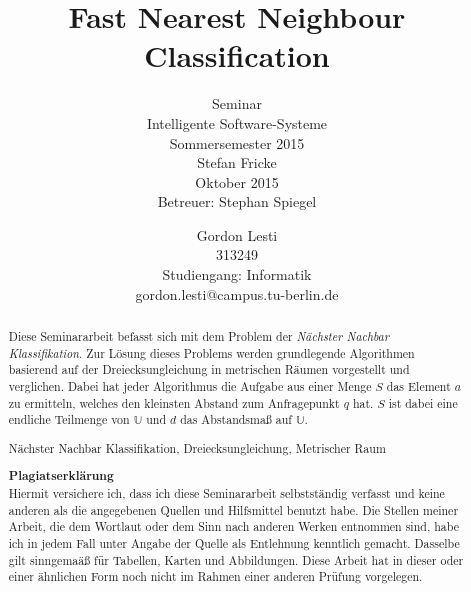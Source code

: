 \documentclass[deutsch,runningheads,a4paper]{llncs}
\newcommand{\keywords}[1]{\par\addvspace\baselineskip
\noindent\keywordname\enspace\ignorespaces#1}
\begin{document}
  \setcounter{tocdepth}{2}
  \makeatletter
  \renewcommand*\l@author[2]{}
  \renewcommand*\l@title[2]{}
  \makeatletter
  \title{Fast Nearest Neighbour Classification}
  \subtitle{\textnormal{\small{Seminar\\Intelligente Software-Systeme\\Sommersemester 2015}\\\vspace{1\baselineskip} Stefan Fricke\\\vspace{15\baselineskip} Oktober 2015\\Betreuer: Stephan Spiegel\\\vspace{2\baselineskip}}}
  
  \author{Gordon Lesti\\313249\\Studiengang: Informatik\\gordon.lesti@campus.tu-berlin.de}
  
  
  \maketitle
  \newpage
  
  \begin{abstract}
    Diese Seminararbeit befasst sich mit dem Problem der \textit{Nächster Nachbar Klassifikation}. Zur Lösung dieses
    Problems werden grundlegende Algorithmen basierend auf der Dreiecksungleichung in metrischen Räumen vorgestellt und
    verglichen. Dabei hat jeder Algorithmus die Aufgabe aus einer Menge $S$ das Element $a$ zu ermitteln, welches den
    kleinsten Abstand zum Anfragepunkt $q$ hat. $S$ ist dabei eine endliche Teilmenge von $\mathbb{U}$ und $d$ das
    Abstandsmaß auf $\mathbb{U}$.
    \keywords{Nächster Nachbar Klassifikation, Dreiecksungleichung, Metrischer Raum}\\\vspace{4\baselineskip}
    
    \textbf{Plagiatserklärung}\\
    Hiermit versichere ich, dass ich diese Seminararbeit selbstständig verfasst und keine anderen als die angegebenen
    Quellen und Hilfsmittel benutzt habe. Die Stellen meiner Arbeit, die dem Wortlaut oder dem Sinn nach anderen Werken
    entnommen sind, habe ich in jedem Fall unter Angabe der Quelle als Entlehnung kenntlich gemacht. Dasselbe gilt
    sinngemaäß für Tabellen, Karten und Abbildungen. Diese Arbeit hat in dieser oder einer ähnlichen Form noch nicht im
    Rahmen einer anderen Prüfung vorgelegen.
  \end{abstract}
  
\end{document}
